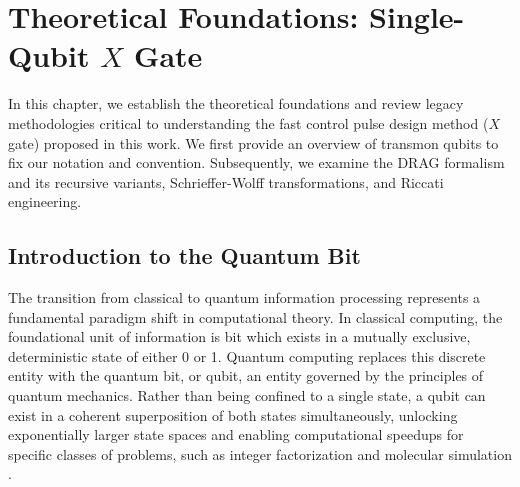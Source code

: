 \section{Theoretical Foundations: Single-Qubit $X$ Gate}


In this chapter, we establish the theoretical foundations and review legacy methodologies critical to understanding
the fast control pulse design method ($X$ gate) proposed in this work.
We first provide an overview of transmon qubits to fix our notation and convention.
Subsequently, we examine the DRAG formalism and its recursive variants, Schrieffer-Wolff transformations, and Riccati engineering.

\subsection{Introduction to the Quantum Bit}
The transition from classical to quantum information processing represents a
fundamental paradigm shift in computational theory. In classical computing, the foundational unit of information is
bit which exists in a mutually exclusive, deterministic state of either 0 or 1. Quantum
computing replaces this discrete entity with the quantum bit, or qubit, an entity governed by the principles of
quantum mechanics. Rather than being confined to a single state, a qubit can exist in a coherent superposition of
both states simultaneously, unlocking exponentially larger state spaces and enabling computational speedups for
specific classes of problems, such as integer factorization \cite{cain2026shorsalgorithmpossible10000} and molecular
simulation \cite{Kandala2017}.

